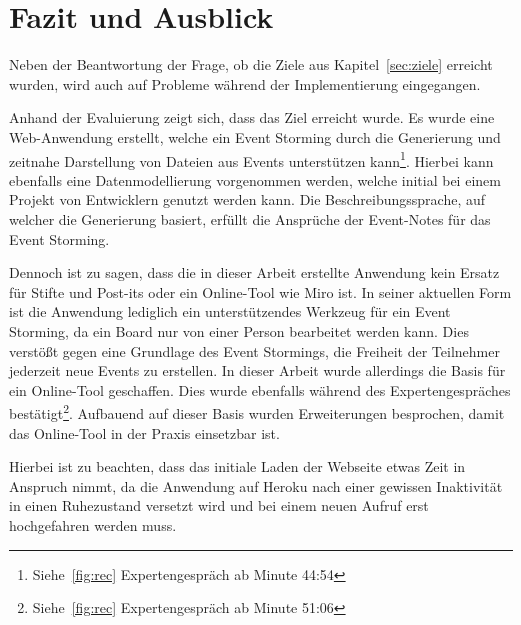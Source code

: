 \chapter{Fazit und Ausblick}\label{ch:fazit}

Neben der Beantwortung der Frage, ob die Ziele aus Kapitel~\ref{sec:ziele} erreicht wurden, wird auch auf Probleme während
der Implementierung eingegangen.

Anhand der Evaluierung zeigt sich, dass das Ziel erreicht wurde.
Es wurde eine Web-Anwendung erstellt, welche ein Event Storming durch die Generierung und zeitnahe Darstellung von Dateien aus Events unterstützen kann\footnote{Siehe~\ref{fig:rec} Expertengespräch ab Minute  44:54}.
Hierbei kann ebenfalls eine Datenmodellierung vorgenommen werden, welche initial bei einem Projekt von Entwicklern genutzt werden kann.
Die Beschreibungssprache, auf welcher die Generierung basiert, erfüllt die Ansprüche der Event-Notes für das Event Storming.

Dennoch ist zu sagen, dass die in dieser Arbeit erstellte Anwendung kein Ersatz für Stifte und Post-its oder ein Online-Tool wie Miro ist.
In seiner aktuellen Form ist die Anwendung lediglich ein unterstützendes Werkzeug für ein Event Storming, da ein Board nur von einer Person bearbeitet werden kann.
Dies verstößt gegen eine Grundlage des Event Stormings, die Freiheit der Teilnehmer jederzeit neue Events zu erstellen.
In dieser Arbeit wurde allerdings die Basis für ein Online-Tool geschaffen.
Dies wurde ebenfalls während des Expertengespräches bestätigt\footnote{Siehe~\ref{fig:rec} Expertengespräch ab Minute  51:06}.
Aufbauend auf dieser Basis wurden Erweiterungen besprochen, damit das Online-Tool in der Praxis einsetzbar ist.

Hierbei ist zu beachten, dass das initiale Laden der Webseite etwas Zeit in Anspruch nimmt, da die Anwendung auf Heroku nach einer gewissen
Inaktivität in einen Ruhezustand versetzt wird und bei einem neuen Aufruf erst hochgefahren werden muss.

